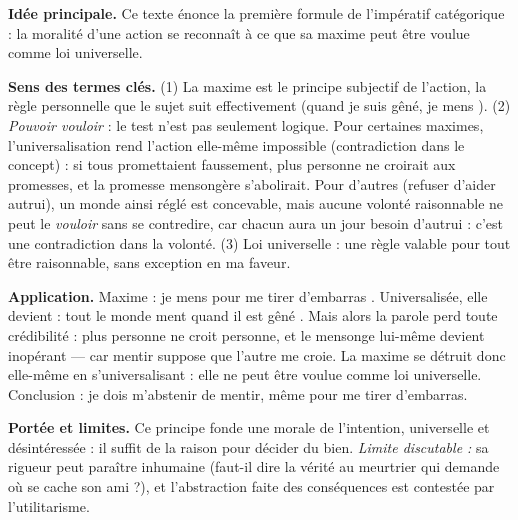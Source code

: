 \documentclass[11pt]{article}
\newcommand{\cle}[1]{{\popxbold\color{popdark}#1}}
\begin{document}
\begin{corrige}

\textbf{Idée principale.} Ce texte énonce la première formule de l'\cle{impératif catégorique} : la moralité d'une action se reconnaît à ce que sa maxime peut être voulue comme loi universelle.

\textbf{Sens des termes clés.} (1) La \cle{maxime} est le principe subjectif de l'action, la règle personnelle que le sujet suit effectivement (\guillemotleft quand je suis gêné, je mens \guillemotright). (2) \emph{Pouvoir vouloir} : le test n'est pas seulement logique. Pour certaines maximes, l'universalisation rend l'action elle-même impossible (contradiction dans le concept) : si tous promettaient faussement, plus personne ne croirait aux promesses, et la promesse mensongère s'abolirait. Pour d'autres (refuser d'aider autrui), un monde ainsi réglé est concevable, mais aucune volonté raisonnable ne peut le \emph{vouloir} sans se contredire, car chacun aura un jour besoin d'autrui : c'est une contradiction dans la volonté. (3) \cle{Loi universelle} : une règle valable pour tout être raisonnable, sans exception en ma faveur.

\textbf{Application.} Maxime : \guillemotleft je mens pour me tirer d'embarras \guillemotright. Universalisée, elle devient : \guillemotleft tout le monde ment quand il est gêné \guillemotright. Mais alors la parole perd toute crédibilité : plus personne ne croit personne, et le mensonge lui-même devient inopérant — car mentir suppose que l'autre me croie. La maxime se détruit donc elle-même en s'universalisant : elle ne peut être voulue comme loi universelle. Conclusion : je dois m'abstenir de mentir, même pour me tirer d'embarras.

\textbf{Portée et limites.} Ce principe fonde une morale de l'intention, universelle et désintéressée : il suffit de la raison pour décider du bien. \emph{Limite discutable :} sa rigueur peut paraître inhumaine (faut-il dire la vérité au meurtrier qui demande où se cache son ami ?), et l'abstraction faite des conséquences est contestée par l'utilitarisme.
\end{corrige}
\end{document}
